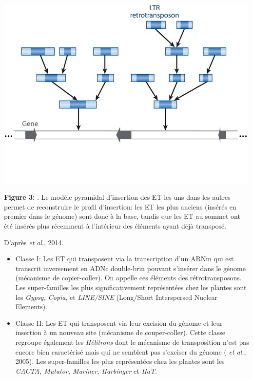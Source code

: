 \documentclass[a4paper, 12pt]{article}
\begin{document}
\begin{onehalfspace}
\newpage
\thispagestyle{empty}
\begin{center}
~ \vfill
\includegraphics[scale=0.65]{pic_Data/fig3.jpg}\\
\end{center}
\vspace{-1.5cm}
\textbf{Figure 3:} . Le modèle pyramidal d'insertion des ET les uns dans les autres permet de reconstruire le profil d'insertion: les ET les plus anciens (insérés en premier dans le génome) sont donc à la base, tandis que les ET au sommet ont été insérés plus récemment à l'intérieur des éléments ayant déjà transposé.
\begin{flushright}
D'après  \textit{et al}., 2014.\\
\end{flushright}
\vfill
\addtocounter{page}{-1}
\newpage

\begin{itemize}
\item Classe I: Les ET qui transposent via la transcription d'un ARNm qui est transcrit inversement en ADNc double-brin pouvant s'insérer dans le génome (mécanisme de copier-coller). On appelle ces éléments des rétrotransposons. Les super-familles les plus significativement représentées chez les plantes sont les \textit{Gypsy, Copia}, et \textit{LINE/SINE} (Long/Short Interspersed Nuclear Elements). 
\item Classe II: Les ET qui transposent via leur excision du génome et leur insertion à un nouveau site (mécanisme de couper-coller). Cette classe regroupe également les \textit{Hélitrons} dont le mécanisme de transposition n'est pas encore bien caractérisé mais qui ne semblent pas s'exciser du génome ( \textit{et al.}, 2005). Les super-familles les plus représentées chez les plantes sont les \textit{CACTA, Mutator, Mariner, Harbinger} et \textit{HaT}.
\end{itemize}


\end{onehalfspace}
\end{document}
